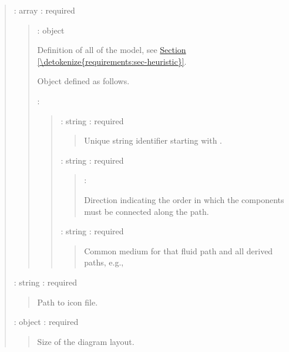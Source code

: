 \documentclass[letterpaper,10pt, openany,english]{sphinxmanual}
\begin{document}
\begin{quote}
 : array : required
\begin{quote}

 : object

\begin{DUlineblock}{0em}
\item[] Definition of all  of the model, see \hyperref[\detokenize{requirements:sec-heuristic}]{Section \ref{\detokenize{requirements:sec-heuristic}}}.
\item[] Object defined as follows.
\end{DUlineblock}

 : 
\begin{quote}

 : string : required
\begin{quote}

Unique string identifier starting with \sphinxcode{\sphinxupquote{\#}}.
\end{quote}

 : string : required
\begin{quote}

 : 

Direction indicating the order in which the components must be connected along the path.
\end{quote}

 : string : required
\begin{quote}

Common medium for that fluid path and all derived paths, e.g., 
\end{quote}
\end{quote}
\end{quote}

 : string : required
\begin{quote}

Path to icon file.
\end{quote}

 : object : required
\begin{quote}

Size of the diagram layout.


\end{quote}
\end{quote}
\end{document}
